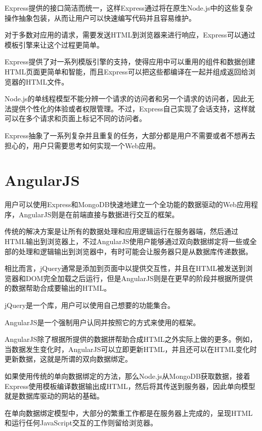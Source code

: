 Express提供的接口简洁而统一，这样Express通过将在原生Node.js中的这些复杂操作抽象包装，从而让用户可以快速编写代码并且容易维护。

对于多数对应用的请求，需要发送HTML到浏览器来进行响应，Express可以通过模板引擎来让这个过程更简单。

Express提供了对一系列模版引擎的支持，使得应用中可以重用的组件和数据创建HTML页面更简单和智能，而且Express可以把这些都编译在一起并组成返回给浏览器的HTML文件。

Node.js的单线程模型不能分辨一个请求的访问者和另一个请求的访问者，因此无法提供个性化的体验或者权限管理。不过，Express自己实现了会话支持，这样就可以在多个请求和页面上标记不同的访问者。

Express抽象了一系列复杂并且重复的任务，大部分都是用户不需要或者不想再去担心的，用户只需要思考如何实现一个Web应用。


\section{AngularJS}

用户可以使用Express和MongoDB快速地建立一个全功能的数据驱动的Web应用程序，AngularJS则是在前端直接与数据进行交互的框架。

传统的解决方案是让所有的数据处理和应用逻辑运行在服务器端，然后通过HTML输出到浏览器上，不过AngularJS使用户能够通过双向数据绑定将一些或全部的处理和逻辑输出到浏览器中，有时可能会让服务器只是从数据库传递数据。

相比而言，jQuery通常是添加到页面中以提供交互性，并且在HTML被发送到浏览器和DOM完全加载之后运行，但是AngularJS则是在更早的阶段并根据所提供的数据帮助合成要输出的HTML。

\begin{compactitem}
\item jQuery是一个库，用户可以使用自己想要的功能集合。
\item AngularJS是一个强制用户认同并按照它的方式来使用的框架。
\end{compactitem}

AngularJS除了根据所提供的数据拼帮助合成HTML之外实际上做的更多。例如，当数据发生变化时，AngularJS可以立即更新HTML，并且还可以在HTML变化时更新数据，这就是所谓的双向数据绑定。


如果使用传统的单向数据绑定的方法，那么Node.js从MongoDB获取数据，接着Express使用模板编译数据输出成HTML，然后将其传送到服务器，因此单向模型就是数据库驱动的网站的基础。

在单向数据绑定模型中，大部分的繁重工作都是在服务器上完成的，呈现HTML和运行任何JavaScript交互的工作则留给浏览器。

